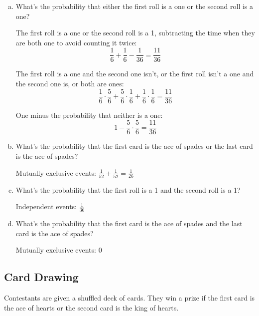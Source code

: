 \documentclass[letterpaper, landscape]{exam}
\begin{document}
  \begin{enumerate}[(a)]
    \item What's the probability that either the first roll is a one or the
      second roll is a one?

      \begin{solution}
      The first roll is a one or the second roll is a 1, subtracting the time
      when they are both one to avoid counting it twice:
        \[
          \frac{1}{6} + \frac{1}{6} - \frac{1}{36} = \frac{11}{36}
        \]

        The first roll is a one and the second one isn't, or the first roll
        isn't a one and the second one is, or both are ones:
        \[
          \frac{1}{6} \cdot \frac{5}{6} + \frac{5}{6} \cdot \frac{1}{6} +
            \frac{1}{6} \cdot \frac{1}{6} = \frac{11}{36} 
        \]

        One minus the probability that neither is a one:
        \[
          1 - \frac{5}{6} \cdot \frac{5}{6} = \frac{11}{36} 
        \]

      \end{solution}

    \item What's the probability that the first card is the ace of spades or the
      last card is the ace of spades?
      \begin{solution}
        Mutually exclusive events: $\frac{1}{52} + \frac{1}{52} = \frac{1}{26}$
      \end{solution}

    \item What's the probability that the first roll is a 1 and the second roll
      is a 1?
      \begin{solution}
        Independent events: $\frac{1}{36}$
      \end{solution}

    \item What's the probability that the first card is the ace of spades and
    the last card is the ace of spades?
      \begin{solution}
        Mutually exclusive events: $0$
      \end{solution}
  \end{enumerate}

  \subsection{Card Drawing}
  Contestants are given a shuffled deck of cards. They win a prize if the first
  card is the ace of hearts or the second card is the king of hearts.
\end{document}
